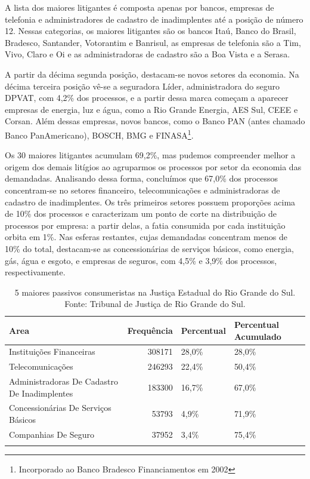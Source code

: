 \documentclass[]{report}
\begin{document}
A lista dos maiores litigantes é composta apenas por bancos, empresas de
telefonia e administradores de cadastro de inadimplentes até a posição
de número 12. Nessas categorias, os maiores litigantes são os bancos
Itaú, Banco do Brasil, Bradesco, Santander, Votorantim e Banrisul, as
empresas de telefonia são a Tim, Vivo, Claro e Oi e as administradoras
de cadastro são a Boa Vista e a Serasa.

A partir da décima segunda posição, destacam-se novos setores da
economia. Na décima terceira posição vê-se a seguradora Líder,
administradora do seguro DPVAT, com 4,2\% dos processos, e a partir
dessa marca começam a aparecer empresas de energia, luz e água, como a
Rio Grande Energia, AES Sul, CEEE e Corsan. Além dessas empresas, novos
bancos, como o Banco PAN (antes chamado Banco PanAmericano), BOSCH, BMG
e FINASA\footnote{Incorporado ao Banco Bradesco Financiamentos em 2002}.

Os 30 maiores litigantes acumulam 69,2\%, mas pudemos compreender melhor
a origem dos demais litígios ao agruparmos os processos por setor da
economia das demandadas. Analisando dessa forma, concluímos que 67,0\%
dos processos concentram-se no setores financeiro, telecomunicações e
administradoras de cadastro de inadimplentes. Os três primeiros setores
possuem proporções acima de 10\% dos processos e caracterizam um ponto
de corte na distribuição de processos por empresa: a partir delas, a
fatia consumida por cada instituição orbita em 1\%. Nas esferas
restantes, cujas demandadas concentram menos de 10\% do total,
destacam-se as concessionárias de serviços básicos, como energia, gás,
água e esgoto, e empresas de seguros, com 4,5\% e 3,9\% dos processos,
respectivamente.

\begin{longtable}{lrll}
\caption{5 maiores passivos consumeristas na Justiça Estadual do Rio Grande do Sul. Fonte: Tribunal de Justiça de Rio Grande do Sul.} \\
  \hline
Area & Frequência & Percentual & Percentual Acumulado \\
  \hline
Instituições
Financeiras & 308171 & 28,0\% & 28,0\% \\
  Telecomunicações & 246293 & 22,4\% & 50,4\% \\
  Administradoras
De Cadastro De
Inadimplentes & 183300 & 16,7\% & 67,0\% \\
  Concessionárias
De Serviços
Básicos & 53793 & 4,9\% & 71,9\% \\
  Companhias De
Seguro & 37952 & 3,4\% & 75,4\% \\
   \hline
\hline
\label{unnamed-chunk-7}
\end{longtable}
\end{document}
